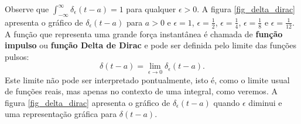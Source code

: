 \documentclass[a4paper,10pt]{book}
\begin{document}
 Observe que $\int_{-\infty}^\infty\delta_\epsilon(t-a)=1$ para qualquer $\epsilon>0$. A figura \ref{fig_delta_dirac} apresenta o gráfico de $\delta_\epsilon(t-a)$ para $a>0$ e $\epsilon=1$, $\epsilon=\frac{1}{2}$, $\epsilon=\frac{1}{4}$, $\epsilon=\frac{1}{8}$ e $\epsilon=\frac{1}{12}$.
 A função que representa uma grande força instantânea é chamada de {\bf função impulso} ou {\bf função Delta de Dirac} e pode ser definida pelo limite das funções pulsos:
 \begin{equation}
 \delta(t-a)=\lim_{\epsilon\to 0}\delta_\epsilon(t-a).
 \end{equation}
 Este limite não pode ser interpretado pontualmente, isto é, como o limite usual de funções reais, mas apenas no contexto de uma integral, como veremos.
 A figura \ref{fig_delta_dirac} apresenta o gráfico de $\delta_\epsilon(t-a)$ quando $\epsilon$ diminui e uma representação gráfica para $\delta(t-a)$.
% 
%   
\end{document}
